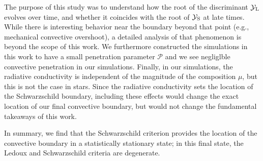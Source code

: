 The purpose of this study was to understand how the root of the discriminant $\mathcal{Y}_{\rm{L}}$ evolves over time, and whether it coincides with the root of $\mathcal{Y}_{\rm{S}}$ at late times.
While there is interesting behavior near the boundary beyond that point (e.g., mechanical convective overshoot), a detailed analysis of that phenomenon is beyond the scope of this work.
We furthermore constructed the simulations in this work to have a small penetration parameter $\mathcal{P}$ \citep{anders_et_al_2021} and we see negliglble convective penetration in our simulations.
Finally, in our simulations, the radiative conductivity is independent of the magnitude of the composition $\mu$, but this is not the case in stars.
Since the radiative conductivity sets the location of the Schwarzschild boundary, including these effects would change the exact location of our final convective boundary, but would not change the fundamental takeaways of this work.

In summary, we find that the Schwarzschild criterion provides the location of the convective boundary in a statistically stationary state; in this final state, the Ledoux and Schwarzschild criteria are degenerate.
